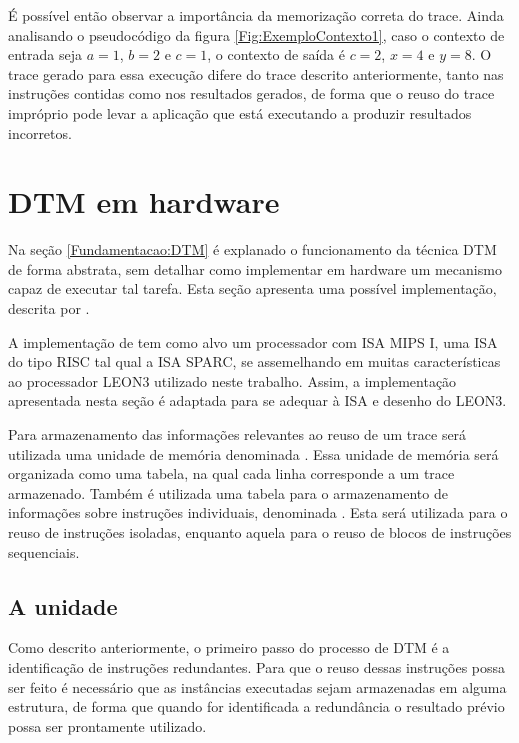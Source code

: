 É possível então observar a importância da memorização correta do trace. Ainda analisando o pseudocódigo da figura \ref{Fig:ExemploContexto1}, caso o contexto de entrada seja $a = 1$, $b = 2$ e $c = 1$, o contexto de saída é $c = 2$, $x = 4$ e $y = 8$. O trace gerado para essa execução difere do trace descrito anteriormente, tanto nas instruções contidas como nos resultados gerados, de forma que o reuso do trace impróprio pode levar a aplicação que está executando a produzir resultados incorretos.

\section{DTM em hardware}
\label{Fundamentacao:DTMHardware}

Na seção \ref{Fundamentacao:DTM} é explanado o funcionamento da técnica DTM de forma abstrata, sem detalhar como implementar em hardware um mecanismo capaz de executar tal tarefa. Esta seção apresenta uma possível implementação, descrita por .

A implementação de  tem como alvo um processador com ISA MIPS I, uma ISA do tipo RISC tal qual a ISA SPARC, se assemelhando em muitas características ao processador LEON3 utilizado neste trabalho. Assim, a implementação apresentada nesta seção é adaptada para se adequar à ISA e desenho do LEON3.

Para armazenamento das informações relevantes ao reuso de um trace será utilizada uma unidade de memória denominada \tablet. Essa unidade de memória será organizada como uma tabela, na qual cada linha corresponde a um trace armazenado. Também é utilizada uma tabela para o armazenamento de informações sobre instruções individuais, denominada \tableg. Esta será utilizada para o reuso de instruções isoladas, enquanto aquela para o reuso de blocos de instruções sequenciais.

\subsection{A unidade \tableg}
\label{Fundamentacao:DTMHardware:TableG}

Como descrito anteriormente, o primeiro passo do processo de DTM é a identificação de instruções redundantes. Para que o reuso dessas instruções possa ser feito é necessário que as instâncias executadas sejam armazenadas em alguma estrutura, de forma que quando for identificada a redundância o resultado prévio possa ser prontamente utilizado.

